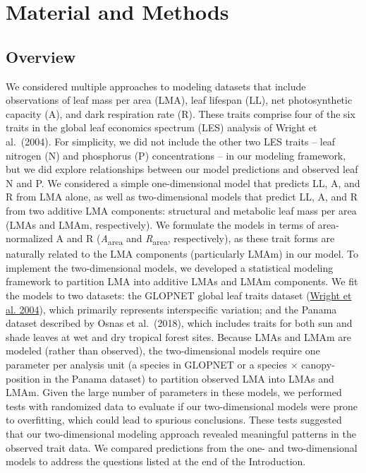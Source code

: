 \documentclass[
  12pt,
  a4paper,
,tablecaptionabove
]{scrartcl}
\begin{document}
\hypertarget{material-and-methods}{%
\section{Material and Methods}\label{material-and-methods}}

\hypertarget{overview}{%
\subsection{Overview}\label{overview}}

We considered multiple approaches to modeling datasets that include
observations of leaf mass per area (LMA), leaf lifespan (LL), net
photosynthetic capacity (A), and dark respiration rate (R). These traits
comprise four of the six traits in the global leaf economics spectrum
(LES) analysis of Wright et al.~(2004). For simplicity, we did not
include the other two LES traits -- leaf nitrogen (N) and phosphorus (P)
concentrations -- in our modeling framework, but we did explore
relationships between our model predictions and observed leaf N and P.
We considered a simple one-dimensional model that predicts LL, A, and R
from LMA alone, as well as two-dimensional models that predict LL, A,
and R from two additive LMA components: structural and metabolic leaf
mass per area (LMAs and LMAm, respectively). We formulate the models in
terms of area-normalized A and R (\emph{A}\textsubscript{area} and
\emph{R}\textsubscript{area}, respectively), as these trait forms are
naturally related to the LMA components (particularly LMAm) in our
model. To implement the two-dimensional models, we developed a
statistical modeling framework to partition LMA into additive LMAs and
LMAm components. We fit the models to two datasets: the GLOPNET global
leaf traits dataset (\protect\hyperlink{ref-Wright2004a}{Wright et al.
2004}), which primarily represents interspecific variation; and the
Panama dataset described by Osnas et al.~(2018), which includes traits
for both sun and shade leaves at wet and dry tropical forest sites.
Because LMAs and LMAm are modeled (rather than observed), the
two-dimensional models require one parameter per analysis unit (a
species in GLOPNET or a species \(\times\) canopy-position in the Panama
dataset) to partition observed LMA into LMAs and LMAm. Given the large
number of parameters in these models, we performed tests with randomized
data to evaluate if our two-dimensional models were prone to
overfitting, which could lead to spurious conclusions. These tests
suggested that our two-dimensional modeling approach revealed meaningful
patterns in the observed trait data. We compared predictions from the
one- and two-dimensional models to address the questions listed at the
end of the Introduction.
\end{document}

